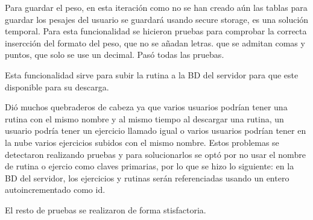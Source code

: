 Para guardar el peso, en esta iteración como no se han creado aún las tablas para guardar los pesajes del usuario se guardará usando secure storage, es una solución temporal. Para esta funcionalidad se hicieron pruebas para comprobar la correcta insercción del formato del peso, que no se añadan letras. que se admitan comas y puntos, que solo se use un decimal. Pasó todas las pruebas.

\hspace{0.5cm}


\hspace{0.5cm}

Esta funcionalidad sirve para subir la rutina a la BD del servidor para que este disponible para su descarga.

Dió muchos quebraderos de cabeza ya que varios usuarios podrían tener una rutina con el mismo nombre y al mismo tiempo al descargar una rutina, un usuario podría tener un ejercicio llamado igual o varios usuarios podrían tener en la nube varios ejercicios subidos con el mismo nombre. Estos problemas se detectaron realizando pruebas y para solucionarlos se optó por no usar el nombre de rutina o ejercio como claves primarias, por lo que se hizo lo siguiente: en la BD del servidor, los ejercicios y rutinas serán referenciadas usando un entero autoincrementado como id.

El resto de pruebas se realizaron de forma stisfactoria.

